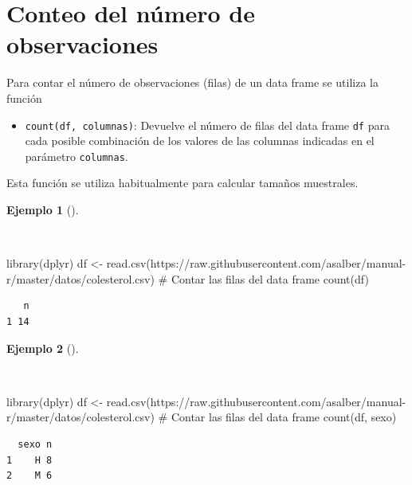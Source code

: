 \documentclass[
  a4paper,
]{scrreport}
\newenvironment{Shaded}{\begin{snugshade}}{\end{snugshade}}
\newcommand{\CommentTok}[1]{\textcolor[rgb]{0.37,0.37,0.37}{#1}}
\newcommand{\FunctionTok}[1]{\textcolor[rgb]{0.28,0.35,0.67}{#1}}
\newcommand{\NormalTok}[1]{\textcolor[rgb]{0.00,0.23,0.31}{#1}}
\newcommand{\OtherTok}[1]{\textcolor[rgb]{0.00,0.23,0.31}{#1}}
\newcommand{\StringTok}[1]{\textcolor[rgb]{0.13,0.47,0.30}{#1}}
\providecommand{\tightlist}{%
  \setlength{\itemsep}{0pt}\setlength{\parskip}{0pt}}\usepackage{longtable,booktabs,array}
\theoremstyle{definition}
\theoremstyle{definition}
\newtheorem{example}{Ejemplo}[chapter]
\theoremstyle{remark}
\begin{document}
\section{Conteo del número de
observaciones}\label{conteo-del-nuxfamero-de-observaciones}

Para contar el número de observaciones (filas) de un data frame se
utiliza la función

\begin{itemize}
\tightlist
\item
  \texttt{count(df,\ columnas)}: Devuelve el número de filas del data
  frame \texttt{df} para cada posible combinación de los valores de las
  columnas indicadas en el parámetro \texttt{columnas}.
\end{itemize}

Esta función se utiliza habitualmente para calcular tamaños muestrales.

\begin{example}[]\protect\hypertarget{exm-count-1}{}\label{exm-count-1}

~

\begin{Shaded}
\begin{Highlighting}[]
\FunctionTok{library}\NormalTok{(dplyr)}
\NormalTok{df }\OtherTok{\textless{}{-}} \FunctionTok{read.csv}\NormalTok{(}\StringTok{\textquotesingle{}https://raw.githubusercontent.com/asalber/manual{-}r/master/datos/colesterol.csv\textquotesingle{}}\NormalTok{)}
\CommentTok{\# Contar las filas del data frame}
\FunctionTok{count}\NormalTok{(df)}
\end{Highlighting}
\end{Shaded}

\begin{verbatim}
   n
1 14
\end{verbatim}

\end{example}

\begin{example}[]\protect\hypertarget{exm-count-2}{}\label{exm-count-2}

~

\begin{Shaded}
\begin{Highlighting}[]
\FunctionTok{library}\NormalTok{(dplyr)}
\NormalTok{df }\OtherTok{\textless{}{-}} \FunctionTok{read.csv}\NormalTok{(}\StringTok{\textquotesingle{}https://raw.githubusercontent.com/asalber/manual{-}r/master/datos/colesterol.csv\textquotesingle{}}\NormalTok{)}
\CommentTok{\# Contar las filas del data frame}
\FunctionTok{count}\NormalTok{(df, sexo)}
\end{Highlighting}
\end{Shaded}

\begin{verbatim}
  sexo n
1    H 8
2    M 6
\end{verbatim}

\end{example}
\end{document}
